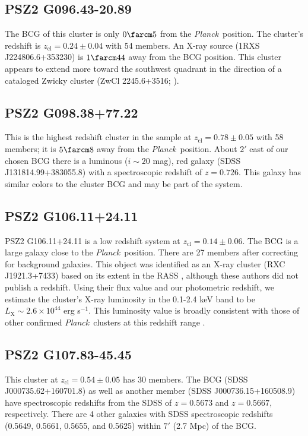 \documentclass[apj, revtex4-1]{emulateapj}
\newcommand{\planck}{\textit{Planck}}
\begin{document}
\subsection{PSZ2 G096.43-20.89} %
The BCG of this cluster is only $0\farcm5$ from the \planck\ position. The cluster's redshift is $z_\mathrm{cl} = 0.24 \pm 0.04$ with 54 members. An X-ray source (1RXS J224806.6+353230) is $1\farcm44$ away from the BCG position. This cluster appears to extend more toward the southwest quadrant in the direction of a cataloged Zwicky cluster (ZwCl 2245.6+3516; \citealt{Zwicky1968}).

\subsection{PSZ2 G098.38+77.22} %
This is the highest redshift cluster in the sample at $z_\mathrm{cl} = 0.78 \pm 0.05$ with 58 members; it is $5\farcm8$ away from the \planck\ position. About $2'$ east of our chosen BCG there is a luminous ($i\sim 20$ mag), red galaxy (SDSS J131814.99+383055.8) with a spectroscopic redshift of $z=0.726$. This galaxy has similar colors to the cluster BCG and may be part of the system.

\subsection{PSZ2 G106.11+24.11} %
PSZ2 G106.11+24.11 is a low redshift system at $z_\mathrm{cl} = 0.14 \pm 0.06$. The BCG is a large galaxy close to the \planck\ position. There are 27 members after correcting for background galaxies. This object was identified as an X-ray cluster (RXC J1921.3+7433) based on its extent in the RASS \citep{Bohringer2000}, although these authors did not publish a redshift. Using their flux value and our photometric redshift, we estimate the cluster's X-ray luminosity in the 0.1-2.4 keV band to be $L_\mathrm{X} \sim 2.6\times 10^{44}$ erg s$^{-1}$. This luminosity value is broadly consistent with those of other confirmed \planck\ clusters at this redshift range \citep{PlanckCollaboration2015}.

\subsection{PSZ2 G107.83-45.45} %
This cluster at $z_\mathrm{cl} = 0.54 \pm 0.05$ has 30 members. The BCG (SDSS J000735.62+160701.8) as well as another member (SDSS J000736.15+160508.9) have spectroscopic redshifts from the SDSS of $z=0.5673$ and $z=0.5667$, respectively. There are 4 other galaxies with SDSS spectroscopic redshifts (0.5649, 0.5661, 0.5655, and 0.5625) within $7'$ (2.7 Mpc) of the BCG.
\end{document}
